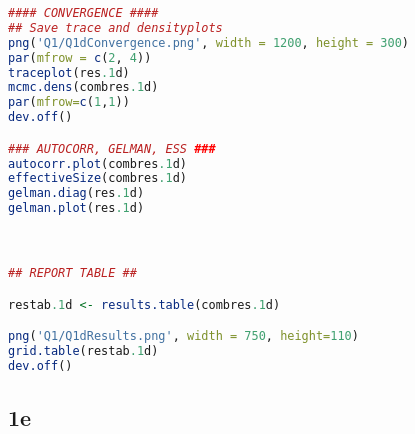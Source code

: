 \documentclass[11pt]{article}
\begin{document}
\begin{lstlisting}[language=R]
#### CONVERGENCE ####
## Save trace and densityplots
png('Q1/Q1dConvergence.png', width = 1200, height = 300)
par(mfrow = c(2, 4))
traceplot(res.1d)
mcmc.dens(combres.1d)
par(mfrow=c(1,1))
dev.off()

### AUTOCORR, GELMAN, ESS ###
autocorr.plot(combres.1d)
effectiveSize(combres.1d)
gelman.diag(res.1d)
gelman.plot(res.1d)



## REPORT TABLE ##

restab.1d <- results.table(combres.1d)

png('Q1/Q1dResults.png', width = 750, height=110)
grid.table(restab.1d)
dev.off()
\end{lstlisting}

\newpage
\subsection{1e} \label{appA1e}
\end{document}
